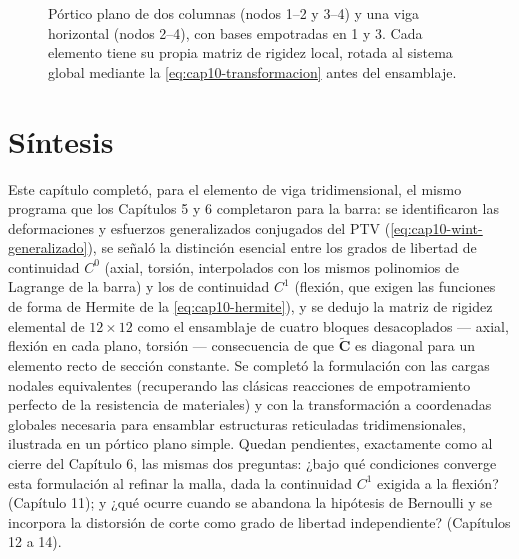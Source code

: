 \begin{figure}[htbp]
\centering
{}
\caption{Pórtico plano de dos columnas (nodos 1--2 y 3--4) y una viga horizontal (nodos 2--4), con bases empotradas en 1 y 3. Cada elemento tiene su propia matriz de rigidez local, rotada al sistema global mediante la \cref{eq:cap10-transformacion} antes del ensamblaje.}
\label{fig:cap10-portico}
\end{figure}

\section{Síntesis}

Este capítulo completó, para el elemento de viga tridimensional, el mismo programa que los Capítulos 5 y 6 completaron para la barra: se identificaron las deformaciones y esfuerzos generalizados conjugados del PTV (\cref{eq:cap10-wint-generalizado}), se señaló la distinción esencial entre los grados de libertad de continuidad $C^0$ (axial, torsión, interpolados con los mismos polinomios de Lagrange de la barra) y los de continuidad $C^1$ (flexión, que exigen las funciones de forma de Hermite de la \cref{eq:cap10-hermite}), y se dedujo la matriz de rigidez elemental de $12\times12$ como el ensamblaje de cuatro bloques desacoplados --- axial, flexión en cada plano, torsión --- consecuencia de que $\tilde{\bm C}$ es diagonal para un elemento recto de sección constante. Se completó la formulación con las cargas nodales equivalentes (recuperando las clásicas reacciones de empotramiento perfecto de la resistencia de materiales) y con la transformación a coordenadas globales necesaria para ensamblar estructuras reticuladas tridimensionales, ilustrada en un pórtico plano simple. Quedan pendientes, exactamente como al cierre del Capítulo 6, las mismas dos preguntas: ¿bajo qué condiciones converge esta formulación al refinar la malla, dada la continuidad $C^1$ exigida a la flexión? (Capítulo 11); y ¿qué ocurre cuando se abandona la hipótesis de Bernoulli y se incorpora la distorsión de corte como grado de libertad independiente? (Capítulos 12 a 14).
